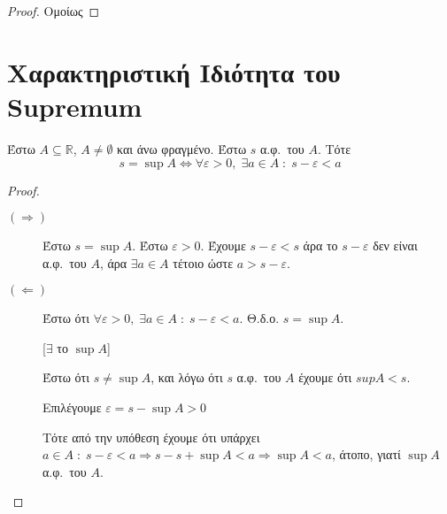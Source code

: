 \documentclass[main.tex]{subfiles}
\begin{document}
\begin{proof}
  Ομοίως 
\end{proof}

\section{Χαρακτηριστική Ιδιότητα του Supremum}

\begin{mypropbox}
Έστω $ A \subseteq \mathbb{R} $, $ A \neq \emptyset $ και άνω φραγμένο. 
  Έστω $ s $ α.φ.\ του $A$. Τότε 
  \[
    s= \sup A \Leftrightarrow \forall \varepsilon >0, \; \exists a \in A \; 
    : \; s - \varepsilon < a
\]
\end{mypropbox}

\begin{proof}
\item {}
  \begin{description}
    \item[$ (\Rightarrow) $] 
      Έστω $ s = \sup A $. Έστω $ \varepsilon >0 $. Έχουμε $ 
      s - \varepsilon < s $ άρα το $ s- \varepsilon $ δεν είναι 
      α.φ.\ του $A$, άρα $ \exists a \in A $ τέτοιο ώστε $ 
      a > s- \varepsilon$. 

    \item [$ (\Leftarrow) $] 
      Έστω ότι $ \forall \varepsilon >0, \; \exists a \in A \; : 
      \; s- \varepsilon < a$. Θ.δ.ο. $ s = \sup A $. 


      \begin{minipage}{0.23\textwidth}
      \end{minipage}

      [$ \exists $ το $ \sup A $]

      Έστω ότι $ s \neq \sup A $, και λόγω ότι $ s $ α.φ.\ του $A$ 
      έχουμε ότι $sup A < s $. 

      Επιλέγουμε $ \varepsilon = s - \sup A > 0 $

      Τότε από την υπόθεση έχουμε ότι 
      υπάρχει $ a \in A \; : \; s - \varepsilon < a \Rightarrow s 
      - s + \sup A < a \Rightarrow \sup A < a $, άτοπο, γιατί 
      $ \sup A $ α.φ.\ του $A$.  
  \end{description} 
\end{proof}
\end{document}
